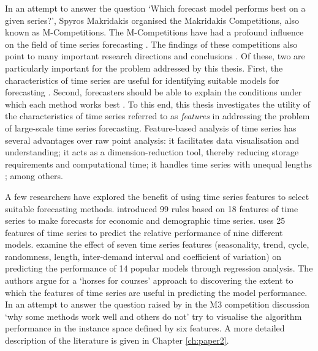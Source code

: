 \documentclass{monashthesis}
\begin{document}
In an attempt to answer the question `Which forecast model performs best on a given series?', Spyros Makridakis organised the Makridakis Competitions, also known as M-Competitions. The M-Competitions have had a profound influence on the field of time series forecasting \autocite{hyndman2019brief}. The findings of these competitions also point to many important
research directions and conclusions \autocite{makridakis2001response}. Of these, two are particularly important for the problem addressed by this thesis. First, the characteristics of time series are useful for identifying suitable models for forecasting \autocites{armstrong2001s}{tashman2001m3}. Second, forecasters should be able to explain the conditions under which each method works best \autocites{hyndman2001s}{makridakis2001response}. To this end, this thesis investigates the utility of the characteristics of time series referred to as \emph{features} in addressing the problem of large-scale time series forecasting. Feature-based analysis of time series has several advantages over raw point analysis: it facilitates data visualisation and understanding; it acts as a dimension-reduction tool, thereby reducing storage requirements and computational time; it handles time series with unequal lengths \autocite{guyon2003introduction}; among others.

A few researchers have explored the benefit of using time series features to select suitable forecasting methods. \textcite{collopy1992rule} introduced 99 rules based on 18 features of time series to make forecasts for economic and demographic time series. \textcite{meade2000evidence} uses 25 features of time series to predict the relative performance of nine different models. \textcite{petropoulos2014horses} examine the effect of seven time series features (seasonality, trend, cycle, randomness, length, inter-demand interval and coefficient of variation) on predicting the performance of 14 popular models through regression analysis. The authors argue for a `horses for courses' approach to discovering the extent to which the features of time series are useful in predicting the model performance. In an attempt to answer the question raised by \textcite{hyndman2001s} in the M3 competition discussion `why some methods work well and others do not' \textcite{kang2017visualising} try to visualise the algorithm performance in the instance space defined by six features. A more detailed description of the literature is given in Chapter \ref{ch:paper2}.
\end{document}
